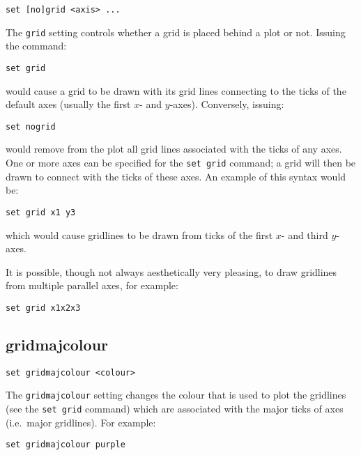 \begin{verbatim}
set [no]grid <axis> ...
\end{verbatim}

The {\tt grid} setting controls whether a grid is placed behind a plot or not.
Issuing the command:

\begin{verbatim}
set grid
\end{verbatim}

\noindent would cause a grid to be drawn with its grid lines connecting to the ticks of
the default axes (usually the first $x$- and $y$-axes).  Conversely, issuing:

\begin{verbatim}
set nogrid
\end{verbatim}

\noindent would remove from the plot all grid lines associated with the ticks of any axes.
One or more axes can be specified for the {\tt set grid} command; a grid will
then be drawn to connect with the ticks of these axes. An example of this syntax
would be:

\begin{verbatim}
set grid x1 y3
\end{verbatim}

\noindent which would cause gridlines to be drawn from ticks of the first $x$- and third
$y$-axes.

It is possible, though not always aesthetically very pleasing, to draw
gridlines from multiple parallel axes, for example:

\begin{verbatim}
set grid x1x2x3
\end{verbatim}


\subsection{gridmajcolour}

\begin{verbatim}
set gridmajcolour <colour>
\end{verbatim}

The {\tt gridmajcolour} setting changes the colour that is used to plot the
gridlines (see the {\tt set grid} command) which are associated with the major
ticks of axes (i.e.\ major gridlines). For example:

\begin{verbatim}
set gridmajcolour purple
\end{verbatim}

